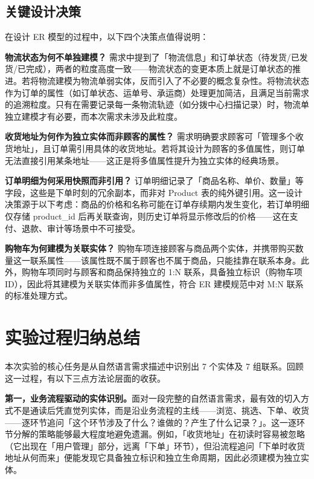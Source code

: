 \documentclass[12pt, a4paper]{academics}
\begin{document}
\subsection{关键设计决策}

在设计 ER 模型的过程中，以下四个决策点值得说明：

\textbf{物流状态为何不单独建模？} 需求中提到了「物流信息」和订单状态（待发货/已发货/已完成），两者的粒度高度一致——物流状态的变更本质上就是订单状态的推进。若将物流建模为物流单弱实体，反而引入了不必要的概念复杂性。将物流状态作为订单的属性（如订单状态、运单号、承运商）处理更加简洁，且满足当前需求的追溯粒度。只有在需要记录每一条物流轨迹（如分拨中心扫描记录）时，物流单独立建模才有必要，而本次需求未涉及此粒度。

\textbf{收货地址为何作为独立实体而非顾客的属性？} 需求明确要求顾客可「管理多个收货地址」，且订单需引用具体的收货地址。若将其设计为顾客的多值属性，则订单无法直接引用某条地址——这正是将多值属性提升为独立实体的经典场景。

\textbf{订单明细为何采用快照而非引用？} 订单明细记录了「商品名称、单价、数量」等字段，这些是下单时刻的冗余副本，而非对 Product 表的纯外键引用。这一设计决策源于以下考虑：商品的价格和名称可能在订单存续期内发生变化，若订单明细仅存储 product\_id 后再关联查询，则历史订单将显示修改后的价格——这在支付、退款、审计等场景中不可接受。

\textbf{购物车为何建模为关联实体？} 购物车项连接顾客与商品两个实体，并携带购买数量这一联系属性——该属性既不属于顾客也不属于商品，只能挂靠在联系本身。此外，购物车项同时与顾客和商品保持独立的 1:N 联系，具备独立标识（购物车项ID），因此将其建模为关联实体而非多值属性，符合 ER 建模规范中对 M:N 联系的标准处理方式。

\section{实验过程归纳总结}

本次实验的核心任务是从自然语言需求描述中识别出 7 个实体及 7 组联系。回顾这一过程，有以下三点方法论层面的收获。

\textbf{第一，业务流程驱动的实体识别。}面对一段完整的自然语言需求，最有效的切入方式不是通读后凭直觉列实体，而是沿业务流程的主线——浏览、挑选、下单、收货——逐环节追问「这个环节涉及了什么？谁做的？产生了什么记录？」。这一逐环节分解的策略能够最大程度地避免遗漏。例如，「收货地址」在初读时容易被忽略（它出现在「用户管理」部分，远离「下单」环节），但沿流程追问「下单时收货地址从何而来」便能发现它具备独立标识和独立生命周期，因此必须建模为独立实体。
\end{document}

